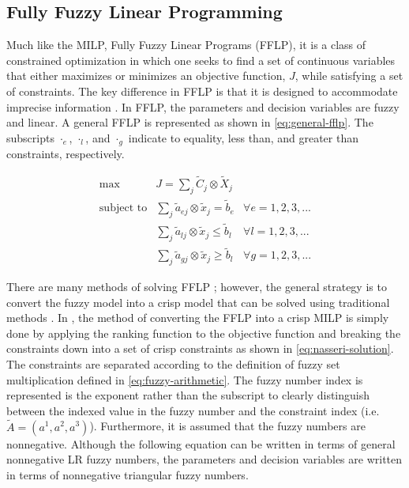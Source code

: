 \documentclass[ee,msthesis]{usuthesis}
\begin{document}
\subsection{Fully Fuzzy Linear Programming}
\label{sec:fully-fuzzy-linear-programming}
Much like the MILP, Fully Fuzzy Linear Programs (FFLP), it is a class of constrained optimization in which one seeks to
find a set of continuous variables that either maximizes or minimizes an objective function, \(J\), while satisfying a set
of constraints. The key difference in FFLP is that it is designed to accommodate imprecise information
\cite{bello-2019-fuzzy-activ,kaur-2016-introd-fuzzy}. In FFLP, the parameters and decision variables are fuzzy and
linear. A general FFLP is represented as shown in \ref{eq:general-fflp}. The subscripts \(\cdot_e\), \(\cdot_l\), and \(\cdot_g\) indicate to
equality, less than, and greater than constraints, respectively.

\begin{equation}
\label{eq:general-fflp}
\begin{array}{lll}
\text{max}   & J = \sum_j \tilde{C}_j \otimes \tilde{X}_j              &                 \\
\text{subject to} & \sum_j \tilde{a}_{ej} \otimes \tilde{x}_j = \tilde{b}_e &  \forall e = 1,2,3,... \\
                  & \sum_j \tilde{a}_{lj} \otimes \tilde{x}_j \le \tilde{b}_l &  \forall l = 1,2,3,... \\
                  & \sum_j \tilde{a}_{gj} \otimes \tilde{x}_j \ge \tilde{b}_l &  \forall g = 1,2,3,...
\end{array}
\end{equation}

There are many methods of solving FFLP
\cite{bello-2019-fuzzy-activ,kaur-2016-introd-fuzzy,ebrahimnejad-2016-new-method,nasseri-2013-fully}; however, the
general strategy is to convert the fuzzy model into a crisp model that can be solved using traditional methods
\cite{bello-2019-fuzzy-activ}. In \cite{nasseri-2013-fully,bello-2019-fuzzy-activ}, the method of converting the FFLP
into a crisp MILP is simply done by applying the ranking function to the objective function and breaking the constraints
down into a set of crisp constraints as shown in \ref{eq:nasseri-solution}. The constraints are separated according to the
definition of fuzzy set multiplication defined in \ref{eq:fuzzy-arithmetic}. The fuzzy number index is represented is the
exponent rather than the subscript to clearly distinguish between the indexed value in the fuzzy number and the
constraint index (i.e. \(\tilde{A} = (a^1,a^2,a^3)\)). Furthermore, it is assumed that the fuzzy numbers are nonnegative.
Although the following equation can be written in terms of general nonnegative LR fuzzy numbers, the parameters and
decision variables are written in terms of nonnegative triangular fuzzy numbers.
\end{document}
